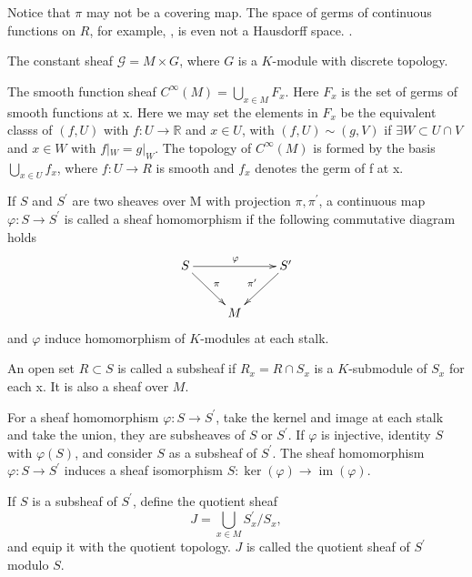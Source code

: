 \documentclass[twoside]{article}
\begin{document}
 Notice that $\pi$ may not be  a covering map. The space of germs of continuous functions on $R$, for example, , is even  not  a Hausdorff space.  .


\begin{example}
  The constant sheaf $\mathcal{G} = M\times G$, where $G$  is a $K$-module with discrete topology.
\end{example}
\begin{example}
  The smooth function sheaf $C^\infty(M)=\bigcup_{x\in M}F_x$. Here  $F_x$ is the set of germs of smooth functions at x. Here we may set the elements in $F_x$ be the equivalent  classs of $(f,U)$ with $f\colon U\to \mathbb{R}$ and $x\in U$, with $(f,U)\sim (g,V)$ if $\exists W\subset U\cap V$ and $x\in W$ with $f|_W=g|_W$. The topology of $C^\infty(M)$ is formed by the basis  $\bigcup_{x\in U}f_x$,    where $f\colon U\to R$ is smooth and $f_x $ denotes the germ of f at x.
\end{example}
\begin{definition}
If $S$ and $S^\prime $ are two sheaves over M with projection $\pi,\pi^\prime$, a continuous map $\varphi\colon S\to S^\prime$ is called a sheaf homomorphism if  the following commutative diagram holds
\begin{equation*}
  \xymatrix{
  S\ar[dr]^{\pi} \ar[rr]^{\varphi} & & S^\prime \ar[dl]_{\pi^\prime}\\
  & M & \\
  }
\end{equation*}
and $\varphi$ induce homomorphism of $K$-modules at each stalk.
\end{definition}

\begin{definition}An open set $R\subset S$ is called a subsheaf if $R_x=R\cap S_x$ is a $K$-submodule  of $S_x$ for each x. It is also a sheaf over $M$.
\end{definition}

For a sheaf homomorphism $\varphi\colon S\to S^\prime$,  take the kernel and image at each stalk and take the union, they are  subsheaves of $S$ or $S^\prime$. If $\varphi$ is injective, identity $S$ with $\varphi(S)$, and consider $S$ as a subsheaf of $S^\prime$. The sheaf homomorphism $\varphi\colon S\to S^\prime$ induces a sheaf isomorphism $S\colon \ker(\varphi)\to \operatorname{im}(\varphi)$.

If $S$ is a subsheaf of $S^\prime$, define the quotient sheaf $$
J=\bigcup_{x\in M} S^\prime_x/S_x,
$$
and equip it with the quotient topology. $J$ is called the quotient sheaf of $S^\prime $ modulo $S$.
\end{document}
